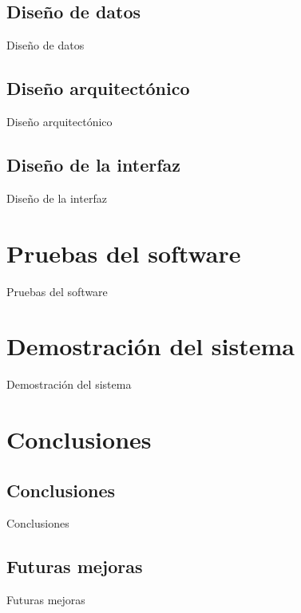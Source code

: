 \documentclass[10pt, hyperref={pdfpagelabels=false}]{beamer}
\begin{document}
    \subsection{Diseño de datos}
      \begin{frame}{Diseño de datos}

      \end{frame}

    \subsection{Diseño arquitectónico}
      \begin{frame}{Diseño arquitectónico}

      \end{frame}

    \subsection{Diseño de la interfaz}
      \begin{frame}{Diseño de la interfaz}

      \end{frame}


  \section{Pruebas del software}
    \begin{frame}{Pruebas del software}

    \end{frame}


  \section{Demostración del sistema}
    \begin{frame}{Demostración del sistema}

    \end{frame}


  \section{Conclusiones}
    \subsection{Conclusiones}
      \begin{frame}{Conclusiones}

      \end{frame}

    \subsection{Futuras mejoras}
      \begin{frame}{Futuras mejoras}

      \end{frame}
\end{document}
